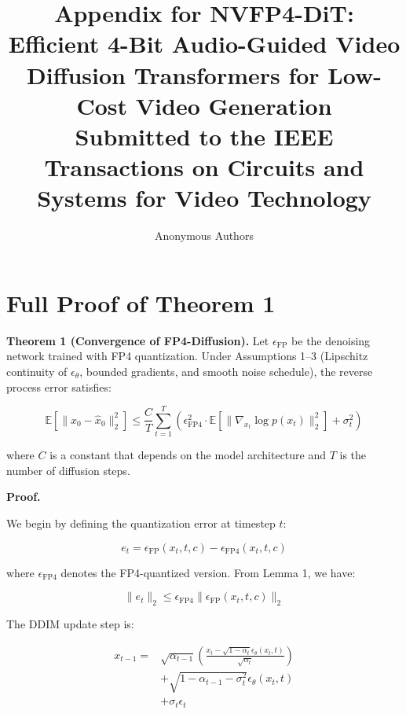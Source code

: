\documentclass[journal,twoside]{IEEEtran}
\theoremstyle{definition}
\theoremstyle{remark}
\newcommand{\EE}{\mathbb{E}}
\begin{document}
\title{Appendix for NVFP4-DiT: Efficient 4-Bit Audio-Guided Video Diffusion Transformers for Low-Cost Video Generation \\ {\small Submitted to the IEEE Transactions on Circuits and Systems for Video Technology}}

\author{Anonymous Authors}

\maketitle

\appendices

\section{Full Proof of Theorem 1}
\label{app:a}

\textbf{Theorem 1 (Convergence of FP4-Diffusion).}
Let $\epsilon_{\text{FP}}$ be the denoising network trained with FP4 quantization. Under Assumptions 1--3 (Lipschitz continuity of $\epsilon_\theta$, bounded gradients, and smooth noise schedule), the reverse process error satisfies:

\[
\EE[\|x_0 - \hat{x}_0\|_2^2] \leq \frac{C}{T} \sum_{t=1}^T \left( \epsilon_{\text{FP4}}^2 \cdot \EE[\|\nabla_{x_t} \log p(x_t)\|_2^2] + \sigma_t^2 \right)
\]

where $C$ is a constant that depends on the model architecture and $T$ is the number of diffusion steps.

\textbf{Proof.}

We begin by defining the quantization error at timestep $t$:

\[
e_t = \epsilon_{\text{FP}}(x_t, t, c) - \epsilon_{\text{FP4}}(x_t, t, c)
\]

where $\epsilon_{\text{FP4}}$ denotes the FP4-quantized version. From Lemma 1, we have:

\[
\|e_t\|_2 \leq \epsilon_{\text{FP4}} \|\epsilon_{\text{FP}}(x_t, t, c)\|_2
\]

The DDIM update step is:

\begin{equation}
\begin{split}
x_{t-1} = &\sqrt{\alpha_{t-1}} \left( \frac{x_t - \sqrt{1-\alpha_t} \epsilon_\theta(x_t, t)}{\sqrt{\alpha_t}} \right) \\
&+ \sqrt{1-\alpha_{t-1} - \sigma_t^2} \epsilon_\theta(x_t, t) \\
&+ \sigma_t \epsilon_t
\end{split}
\end{equation}
\end{document}
